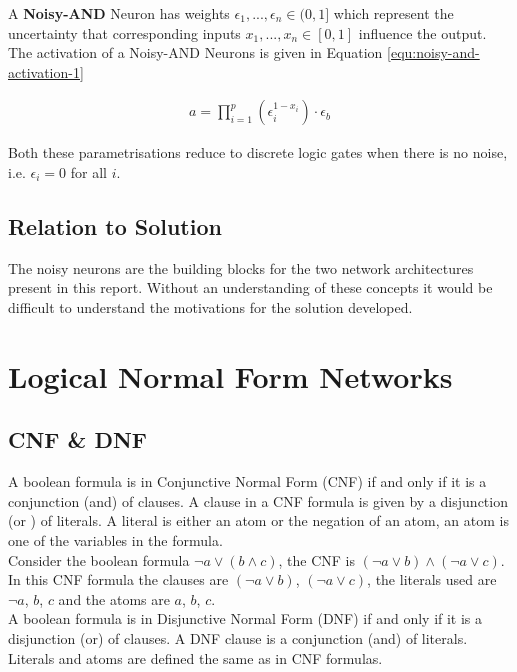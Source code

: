 \begin{definition}
	A \textbf{Noisy-AND} Neuron has weights $\epsilon_1, ..., \epsilon_n \in (0, 1]$ which represent the uncertainty that corresponding inputs $x_1, ..., x_n \in [0,1]$ influence the output. The activation of a Noisy-AND Neurons is given in Equation \ref{equ:noisy-and-activation-1}
	
	\begin{align}
	a = \prod^p_{i=1} (\epsilon_i^{1 - x_i}) \cdot \epsilon_b
	\label{equ:noisy-and-activation-1}
	\end{align}
\end{definition}

Both these parametrisations reduce to discrete logic gates when there is no noise, i.e. $\epsilon_i = 0$ for all $i$.\\

\subsection{Relation to Solution}
The noisy neurons are the building blocks for the two network architectures present in this report. Without an understanding of these concepts it would be difficult to understand the motivations for the solution developed.

\section{Logical Normal Form Networks}
\subsection{CNF \& DNF}
A boolean formula is in Conjunctive Normal Form (CNF) if and only if it is a conjunction (and) of clauses. A clause in a CNF formula is given by a disjunction (or ) of literals. A literal is either an atom or the negation of an atom, an atom is one of the variables in the formula.\\

Consider the boolean formula $\lnot a \lor (b \land c)$, the CNF is $(\lnot a \lor b) \land (\lnot a \lor c)$. In this CNF formula the clauses are $(\lnot a \lor b)$, $(\lnot a \lor c)$, the literals used are $\lnot a$, $b$, $c$ and the atoms are $a$, $b$, $c$.\\

A boolean formula is in Disjunctive Normal Form (DNF) if and only if it is a disjunction (or) of clauses. A DNF clause is a conjunction (and) of literals. Literals and atoms are defined the same as in CNF formulas.\\

